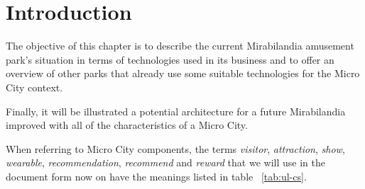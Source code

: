 \section*{Introduction}
\label{sec:introduction}

The objective of this chapter is to describe the current Mirabilandia amusement park's situation in terms of technologies used in its business and to offer an overview of other parks that already use some suitable technologies for the Micro City context.

Finally, it will be illustrated a potential architecture for a future Mirabilandia improved with all of the characteristics of a Micro City.

When referring to Micro City components, the terms \textit{visitor}, \textit{attraction}, \textit{show}, \textit{wearable}, \textit{recommendation}, \textit{recommend} and \textit{reward} that we will use in the document form now on have the meanings listed in table ~\ref{tab:ul-cs}.